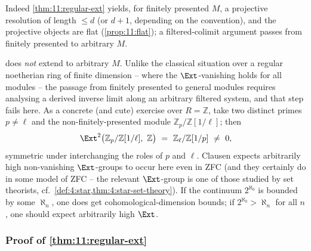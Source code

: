 Indeed \cref{thm:11:regular-ext} yields, for finitely presented $M$, a
projective resolution of length $\le d$ (or $d+1$, depending on the
convention), and the projective objects are flat (\cref{prop:11:flat}); a
filtered-colimit argument passes from finitely presented to arbitrary $M$.

\begin{remark}
\label{rmk:11:not-fp}
 does \emph{not} extend to arbitrary $M$. Unlike the
classical situation over a regular noetherian ring of finite dimension -- where
the $\Ext$-vanishing holds for all modules -- the passage from finitely
presented to general modules requires analysing a derived inverse limit along
an arbitrary filtered system, and that step fails here. As a concrete (and
cute) exercise over $R=\mathbb{Z}$, take two distinct primes $p\ne\ell$ and the
non-finitely-presented module $\mathbb{Z}_{p}/\mathbb{Z}[1/\ell]$; then
\begin{equation*}
\Ext^{2}\bigl(\mathbb{Z}_{p}/\mathbb{Z}[1/\ell],\ \mathbb{Z}\bigr)\ =\
\mathbb{Z}_{\ell}/\mathbb{Z}[1/p]\ \neq\ 0,
\end{equation*}
symmetric under interchanging the roles of $p$ and $\ell$. Clausen expects
arbitrarily high non-vanishing $\Ext$-groups to occur here even in ZFC (and
they certainly do in some model of ZFC -- the relevant $\Ext$-group is one of
those studied by set theorists, cf.\ \cref{def:4:star,thm:4:star-set-theory}).
If the continuum $2^{\aleph_{0}}$ is bounded by some $\aleph_{n}$, one does
get cohomological-dimension bounds; if $2^{\aleph_{0}}>\aleph_{n}$ for all $n$,
one should expect arbitrarily high $\Ext$.
\end{remark}

\subsubsection*{Proof of \texorpdfstring{\cref{thm:11:regular-ext}}{the theorem}}

